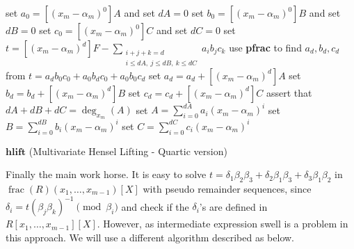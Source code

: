 \documentclass[11pt,reqno]{amsart}
\numberwithin{equation}{section}
\newcommand{\op}[1]  { \operatorname{ #1 }}
\begin{document}
\begin{algorithm}[H]
\DontPrintSemicolon
{}

set $a_0 = [(x_m - \alpha_m)^0] A$ and set $dA = 0$\;
set $b_0 = [(x_m - \alpha_m)^0] B$ and set $dB = 0$\;
set $c_0 = [(x_m - \alpha_m)^0] C$ and set $dC = 0$\;
\For{$d=1$ \KwTo $\op{deg}_{x_m}(A)$}
{
	set $t = [(x_m - \alpha_m)^d]F - \sum_{\substack{i+j+k=d \\ i \le dA, \ j \le dB, \ k \le dC}} a_i b_j c_k$\;
	use \textbf{pfrac} to find $a_d, b_d, c_d$ from $t=a_d b_0 c_0+a_0 b_d c_0+a_0 b_0 c_d$\;
	set $a_d = a_d + [(x_m - \alpha_m)^d]A$\;
	set $b_d = b_d + [(x_m - \alpha_m)^d]B$\;
	set $c_d = c_d + [(x_m - \alpha_m)^d]C$\;
	\lIf{$dA + dB + dC > \op{deg}_{x_m}(A)$}{\Return{FAIL}}
}
assert that $dA + dB + dC = \op{deg}_{x_m}(A)$\;
set $A = \sum_{i=0}^{dA} a_i (x_m - \alpha_m)^i$\;
set $B = \sum_{i=0}^{dB} b_i (x_m - \alpha_m)^i$\;
set $C = \sum_{i=0}^{dC} c_i (x_m - \alpha_m)^i$\;
\caption{$\textbf{hlift}$ (Multivariate Hensel Lifting - Quartic version)}
\label{algo_mlift2}
\end{algorithm}

Finally the main work horse. It is easy to solve $t=\delta_1\beta_2\beta_3+\delta_2\beta_1\beta_3+\delta_3\beta_1\beta_2$ in $\op{frac}(R)(x_1,\dots,x_{m-1})[X]$ with pseudo remainder sequences, since 
$\delta_i= t(\beta_j\beta_k)^{-1}\pmod {\beta_i}$ and check if the $\delta_i$'s are  defined in $R[x_1,\dots, x_{m-1}][X]$. However, as intermediate expression swell is a problem in this approach. We will use a different algorithm described as below.
\end{document}
